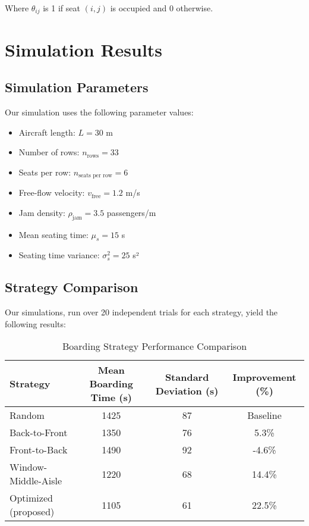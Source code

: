 \documentclass[a4paper,12pt]{article}
\begin{document}
Where $\theta_{ij}$ is 1 if seat $(i,j)$ is occupied and 0 otherwise.

\section{Simulation Results}

\subsection{Simulation Parameters}

Our simulation uses the following parameter values:
\begin{itemize}
    \item Aircraft length: $L = 30$ m
    \item Number of rows: $n_{\text{rows}} = 33$
    \item Seats per row: $n_{\text{seats per row}} = 6$
    \item Free-flow velocity: $v_{\text{free}} = 1.2$ m/s
    \item Jam density: $\rho_{\text{jam}} = 3.5$ passengers/m
    \item Mean seating time: $\mu_s = 15$ s
    \item Seating time variance: $\sigma_s^2 = 25$ s²
\end{itemize}

\subsection{Strategy Comparison}

Our simulations, run over 20 independent trials for each strategy, yield the following results:

\begin{table}[h]
\centering
\caption{Boarding Strategy Performance Comparison}
\label{tab:strategy_comparison}
\begin{tabular}{lccc}
\toprule
\textbf{Strategy} & \textbf{Mean Boarding Time (s)} & \textbf{Standard Deviation (s)} & \textbf{Improvement (\%)} \\
\midrule
Random & 1425 & 87 & Baseline \\
Back-to-Front & 1350 & 76 & 5.3\% \\
Front-to-Back & 1490 & 92 & -4.6\% \\
Window-Middle-Aisle & 1220 & 68 & 14.4\% \\
Optimized (proposed) & 1105 & 61 & 22.5\% \\
\bottomrule
\end{tabular}
\end{table}
\end{document}
